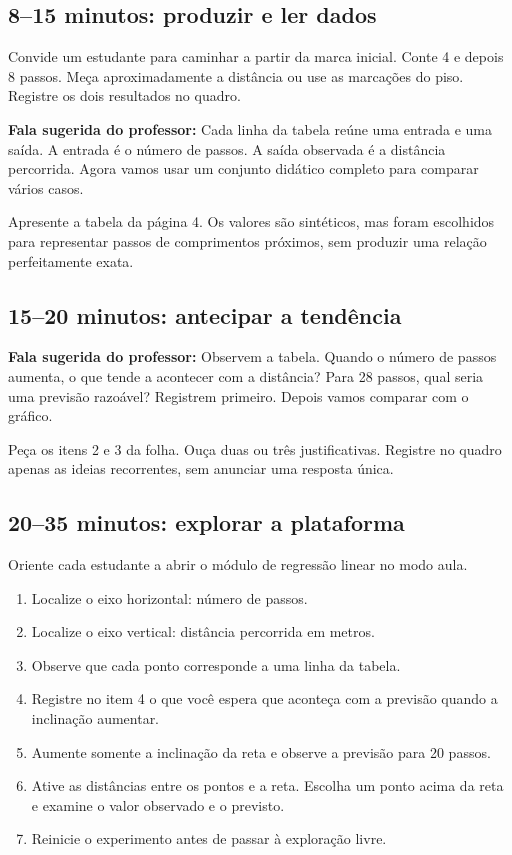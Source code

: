 \documentclass[12pt,a4paper]{article}
\newcommand{\fala}[1]{%
  \noindent\colorbox{cinza}{\parbox{0.96\linewidth}{\textbf{Fala sugerida do professor:} #1}}%
}
\begin{document}
\subsection*{8--15 minutos: produzir e ler dados}

Convide um estudante para caminhar a partir da marca inicial. Conte 4 e depois 8 passos. Meça aproximadamente a distância ou use as marcações do piso. Registre os dois resultados no quadro.

\fala{Cada linha da tabela reúne uma entrada e uma saída. A entrada é o número de passos. A saída observada é a distância percorrida. Agora vamos usar um conjunto didático completo para comparar vários casos.}

Apresente a tabela da página 4. Os valores são sintéticos, mas foram escolhidos para representar passos de comprimentos próximos, sem produzir uma relação perfeitamente exata.

\subsection*{15--20 minutos: antecipar a tendência}

\fala{Observem a tabela. Quando o número de passos aumenta, o que tende a acontecer com a distância? Para 28 passos, qual seria uma previsão razoável? Registrem primeiro. Depois vamos comparar com o gráfico.}

Peça os itens 2 e 3 da folha. Ouça duas ou três justificativas. Registre no quadro apenas as ideias recorrentes, sem anunciar uma resposta única.

\subsection*{20--35 minutos: explorar a plataforma}

Oriente cada estudante a abrir o módulo de regressão linear no modo aula.

\begin{enumerate}
  \item Localize o eixo horizontal: número de passos.
  \item Localize o eixo vertical: distância percorrida em metros.
  \item Observe que cada ponto corresponde a uma linha da tabela.
  \item Registre no item 4 o que você espera que aconteça com a previsão quando a inclinação aumentar.
  \item Aumente somente a inclinação da reta e observe a previsão para 20 passos.
  \item Ative as distâncias entre os pontos e a reta. Escolha um ponto acima da reta e examine o valor observado e o previsto.
  \item Reinicie o experimento antes de passar à exploração livre.
\end{enumerate}
\end{document}
